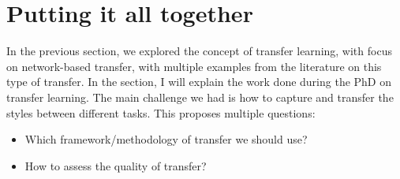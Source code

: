 
\section{Putting it all together}
  \par In the previous section, we explored the concept of transfer learning, with focus on network-based transfer, with multiple examples from the literature on this type of transfer. In the section, I will explain the work done during the PhD on transfer learning. The main challenge we had is how to capture and transfer the styles between different tasks. This proposes multiple questions:
  \begin{itemize}
    \item Which framework/methodology of transfer we should use?
    \item How to assess the quality of transfer?
  \end{itemize}

